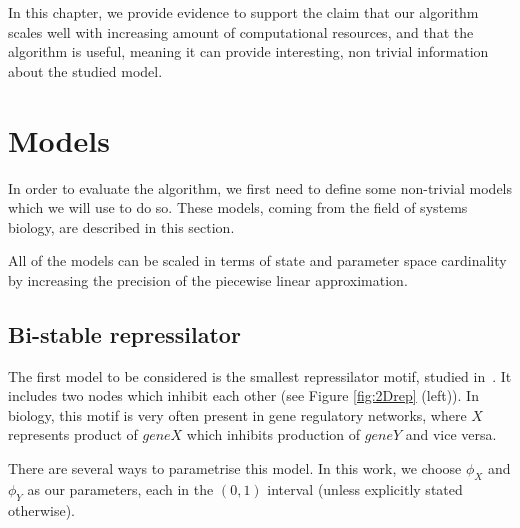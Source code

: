 
In this chapter, we provide evidence to support the claim that our algorithm scales well with increasing amount of computational resources, and that the algorithm is useful, meaning it can provide interesting, non trivial information about the studied model.

\section{Models}

In order to evaluate the algorithm, we first need to define some non-trivial models which we will use to do so. These models, coming from the field of systems biology, are described in this section.

All of the models can be scaled in terms of state and parameter space cardinality by increasing the precision of the piecewise linear approximation.

\subsection{Bi-stable repressilator}

The first model to be considered is the smallest repressilator motif, studied in~\cite{brim2015high,dilao}. It includes two nodes which inhibit each other (see Figure \ref{fig:2Drep} (left)). In biology, this motif is very often present in gene regulatory networks, where $X$ represents product of $gene X$ which inhibits production of $gene Y$ and vice versa.

There are several ways to parametrise this model. In this work, we choose $\phi_X$ and $\phi_Y$ as our parameters, each in the $(0, 1)$ interval (unless explicitly stated otherwise).


